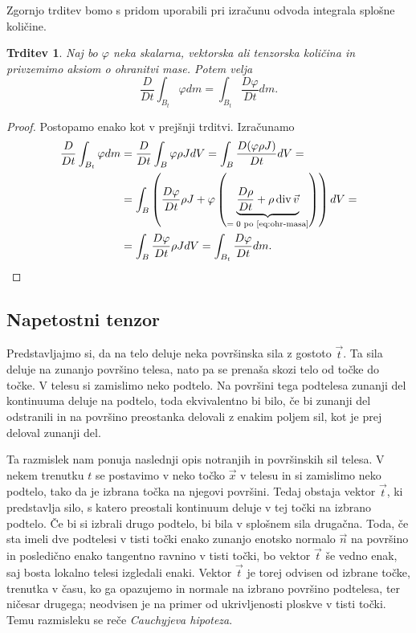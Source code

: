 \documentclass[12pt,a4paper,twoside]{article}
\theoremstyle{definition} %
\theoremstyle{plain} %
\newtheorem{trditev}[definicija]{Trditev}
\numberwithin{equation}{section}
\renewcommand{\div}{\operatorname{div}}
\renewcommand{\phi}{\varphi}
\newcommand{\DD}[2]{\ensuremath{\frac{D #1}{D #2}}}
\newcommand{\DDt}[1]{\DD{#1}{t}}
\newcommand{\vv}{\vec{v}}
\newcommand{\vt}{\vec{t}}
\newcommand{\vn}{\vec{n}}
\newcommand{\vx}{\vec{x}}
\begin{document}
Zgornjo trditev bomo s pridom uporabili pri izračunu odvoda integrala splošne
količine.
\begin{trditev}
  \label{trd:swap-der-int}
  Naj bo $\phi$ neka skalarna, vektorska ali tenzorska količina in privzemimo aksiom o ohranitvi
  mase. Potem velja
  \begin{equation}
    \DDt{} \int_{B_t}\phi dm = \int_{B_t} \DDt{\phi} dm.
    \label{eq:swap-der-int}
  \end{equation}
\end{trditev}
\begin{proof}
Postopamo enako kot v prejšnji trditvi. Izračunamo
\begin{align*}
    \DDt{} \int_{B_t}\phi dm &=
    \DDt{} \int_{B}\phi \rho J dV =
    \int_{B} \DDt{(\phi \rho J)} dV  = \\ &=
  \int_{B} \left(\DDt{\phi} \rho J + \phi \left(\underbrace{\DDt{\rho} + \rho
  \div \vv}_{=\;0 \text{ po \eqref{eq:ohr-masa}}} \right) \right)dV  = \\ &=
  \int_{B} \DDt{\phi} \rho JdV =
  \int_{B_t} \DDt{\phi} dm. \qedhere
\end{align*}
\end{proof}

\subsection{Napetostni tenzor}
Predstavljajmo si, da na telo deluje neka površinska sila z gostoto $\vt$. Ta sila deluje na zunanjo
površino telesa, nato pa se prenaša skozi telo od točke do točke. V telesu si zamislimo neko podtelo.
Na površini tega podtelesa zunanji del kontinuuma deluje na podtelo, toda ekvivalentno bi bilo, če
bi zunanji del odstranili in na površino preostanka delovali z enakim poljem sil, kot je prej
deloval zunanji del.

Ta razmislek nam ponuja naslednji opis notranjih in površinskih sil telesa. V nekem trenutku $t$
se postavimo v neko točko $\vx$ v telesu in si zamislimo neko podtelo, tako da je izbrana točka
na njegovi površini. Tedaj obstaja vektor $\vt$, ki predstavlja silo, s katero preostali kontinuum
deluje v tej točki na izbrano podtelo. Če bi si izbrali drugo podtelo, bi bila v splošnem sila
drugačna. Toda, če sta imeli dve podtelesi v tisti točki enako zunanjo enotsko normalo $\vn$ na
površino  in posledično enako tangentno ravnino v tisti točki, bo vektor $\vt$ še vedno enak, saj
bosta lokalno telesi izgledali enaki. Vektor $\vt$ je torej odvisen od izbrane točke, trenutka v
času, ko ga opazujemo in normale na izbrano površino podtelesa, ter ničesar drugega; neodvisen je na
primer od ukrivljenosti ploskve v tisti točki. Temu razmisleku se reče \emph{Cauchyjeva hipoteza}.
\end{document}
